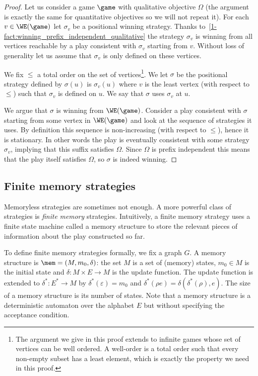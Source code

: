 \begin{proof}
Let us consider a game $\game$ with qualitative objective $\Omega$ (the argument is exactly the same for quantitative objectives so we will not repeat it).
For each $v \in \WE(\game)$ let $\sigma_v$ be a positional winning strategy.
Thanks to~\cref{1-fact:winning_prefix_independent_qualitative}
the strategy $\sigma_v$ is winning from all vertices reachable by a play consistent with $\sigma_v$ starting from $v$.
Without loss of generality let us assume that $\sigma_v$ is only defined on these vertices.

We fix $\le$ a total order on the set of vertices\footnote{The argument we give in this proof extends to infinite games whose set of vertices can be well ordered. A well-order is a total order such that every non-empty subset has a least element, which is exactly the property we need in this proof.}.
We let $\sigma$ be the positional strategy defined by $\sigma(u)$ is $\sigma_v(u)$ where $v$ is the least vertex (with respect to $\le$) such that $\sigma_v$ is defined on $u$. We say that $\sigma$ uses $\sigma_v$ at $u$.

We argue that $\sigma$ is winning from $\WE(\game)$. 
Consider a play consistent with $\sigma$ starting from some vertex in $\WE(\game)$ and look at the sequence of strategies it uses.
By definition this sequence is non-increasing (with respect to $\le$), hence it is stationary.
In other words the play is eventually consistent with some strategy $\sigma_v$, implying that this suffix satisfies $\Omega$.
Since $\Omega$ is prefix independent this means that the play itself satisfies $\Omega$, so $\sigma$ is indeed winning.
\end{proof}

\subsection*{Finite memory strategies}\label{1-finite memory}
Memoryless strategies are sometimes not enough. 
A more powerful class of strategies is \textit{finite memory} strategies.
Intuitively, a finite memory strategy uses a finite state machine called a memory structure 
to store the relevant pieces of information about the play constructed so far.

To define finite memory strategies formally, we fix a graph $G$.
A memory structure is $\mem = (M, m_0, \delta)$: the set $M$ is a set of (memory) states, 
$m_0 \in M$ is the initial state and $\delta : M \times E \to M$ is the update function.
The update function is extended to $\delta^* : E^* \to M$ by 
$\delta^*(\varepsilon) = m_0$ and $\delta^* (\rho e) = \delta(\delta^*(\rho), e)$.
The size of a memory structure is its number of states.
Note that a memory structure is a deterministic automaton over the alphabet $E$ but without specifying the acceptance condition.

